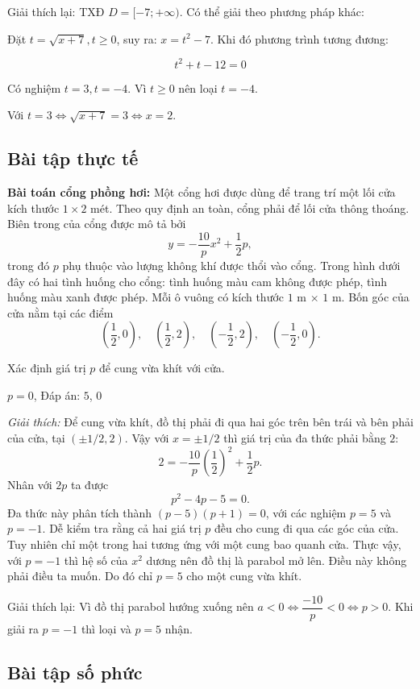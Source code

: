\documentclass[12pt,a4paper]{article}
\begin{document}
Giải thích lại: TXĐ $D = [-7;+\infty)$. Có thể giải theo phương pháp khác:

Đặt $t = \sqrt{x + 7}, t \ge 0$, suy ra: $x = t^2 - 7$. Khi đó phương trình tương đương:

\[
t^2 + t - 12 = 0
\]

Có nghiệm $t = 3, t = -4$. Vì $t \ge 0$ nên loại $t = -4$.

Với $t = 3 \Leftrightarrow \sqrt{x + 7} = 3 \Leftrightarrow x = 2$.

\subsection{Bài tập thực tế}

\textbf{Bài toán cổng phồng hơi:}
Một cổng hơi được dùng để trang trí một lối cửa kích thước $1 \times 2$ mét. Theo quy định an toàn, cổng phải để lối cửa thông thoáng. Biên trong của cổng được mô tả bởi
\[
y = -\dfrac{10}{p}x^2 + \dfrac{1}{2}p,
\]
trong đó $p$ phụ thuộc vào lượng không khí được thổi vào cổng. Trong hình dưới đây có hai tình huống cho cổng: tình huống màu cam không được phép, tình huống màu xanh được phép. Mỗi ô vuông có kích thước $1$ m $\times$ $1$ m. Bốn góc của cửa nằm tại các điểm
\[
\left(\dfrac{1}{2}, 0\right),\quad \left(\dfrac{1}{2}, 2\right),\quad \left(-\dfrac{1}{2}, 2\right),\quad \left(-\dfrac{1}{2}, 0\right).
\]

Xác định giá trị $p$ để cung vừa khít với cửa.

$p = 0$, Đáp án: $5$, $0$

\textit{Giải thích:} Để cung vừa khít, đồ thị phải đi qua hai góc trên bên trái và bên phải của cửa, tại $(\pm 1/2, 2)$. Vậy với $x = \pm 1/2$ thì giá trị của đa thức phải bằng $2$:
\[
2 = -\dfrac{10}{p}\left(\dfrac{1}{2}\right)^2 + \dfrac{1}{2}p.
\]
Nhân với $2p$ ta được
\[
p^2 - 4p - 5 = 0.
\]
Đa thức này phân tích thành $(p-5)(p+1) = 0$, với các nghiệm $p = 5$ và $p = -1$. Dễ kiểm tra rằng cả hai giá trị $p$ đều cho cung đi qua các góc của cửa. Tuy nhiên chỉ một trong hai tương ứng với một cung bao quanh cửa. Thực vậy, với $p = -1$ thì hệ số của $x^2$ dương nên đồ thị là parabol mở lên. Điều này không phải điều ta muốn. Do đó chỉ $p = 5$ cho một cung vừa khít.

Giải thích lại: Vì đồ thị parabol hướng xuống nên $a < 0 \Leftrightarrow \dfrac{-10}{p} < 0 \Leftrightarrow p > 0$. Khi giải ra $p = -1$ thì loại và $p = 5$ nhận.

\subsection{Bài tập số phức}
\end{document}
